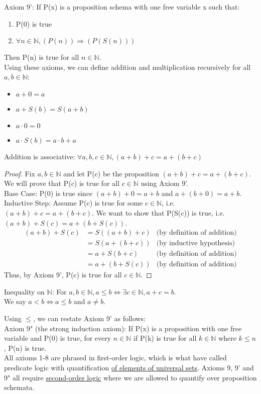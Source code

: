 Axiom 9': If P(x) is a proposition schema with one free variable x such that: 
\begin{enumerate}
  \item P(0) is true
  \item $\forall n \in \mathbb{N}, (P(n)) \Rightarrow (P(S(n)))$ 
\end{enumerate}
Then P(n) is true for all $n \in \mathbb{N}$.
\\
Using these axioms, we can define addition and multiplication recursively for all $a, b \in \mathbb{N}$:
\begin{itemize}
  \item $a + 0 = a$
  \item $a + S(b) = S(a + b)$
\end{itemize}
\begin{itemize}
  \item $a \cdot 0 = 0$
  \item $a \cdot S(b) = a \cdot b + a$
\end{itemize}
\begin{theorem}
  Addition is associative:
  $\forall a, b, c \in \mathbb{N}, (a + b) + c = a + (b + c)$
\end{theorem}
\begin{proof}
  Fix $a, b \in \mathbb{N}$ and let P(c) be the proposition $(a + b) + c = a + (b + c)$. We will prove that P(c) is true for all $c \in \mathbb{N}$ using Axiom 9'.
  \\
  Base Case: P(0) is true since $(a + b) + 0 = a + b$ and $a + (b + 0) = a + b$.
  \\
  Inductive Step: Assume P(c) is true for some $c \in \mathbb{N}$, i.e. $(a + b) + c = a + (b + c)$. We want to show that P(S(c)) is true, i.e. $(a + b) + S(c) = a + (b + S(c))$.
  \begin{align*}
    (a + b) + S(c) &= S((a + b) + c) &\text{(by definition of addition)}\\
    &= S(a + (b + c)) &\text{(by inductive hypothesis)}\\
    &= a + S(b + c) &\text{(by definition of addition)}\\
    &= a + (b + S(c)) &\text{(by definition of addition)}
  \end{align*}
  Thus, by Axiom 9', P(c) is true for all $c \in \mathbb{N}$.
\end{proof}
\begin{definition}
  Inequality on $\mathbb{N}$: For $a, b \in \mathbb{N}, a \leq b \iff \exists c \in \mathbb{N}, a + c = b$. 
  \\
  We say $a < b \iff a \leq b$ and $a \neq b$.
\end{definition}
Using $\leq$, we can restate Axiom 9' as follows:
\\
Axiom 9" (the strong induction axiom): If P(x) is a proposition with one free variable and P(0) is true, for every $n \in \mathbb{N}$ if P(k) is true for all $k \in \mathbb{N}$ where $k \leq n$, P(n) is true.
\\
All axioms 1-8 are phrased in first-order logic, which is what have called predicate logic with quantification \underline{of elements of universal sets}. Axioms 9, 9' and 9" all require \underline{second-order logic} where we are allowed to quantify over proposition schemata.